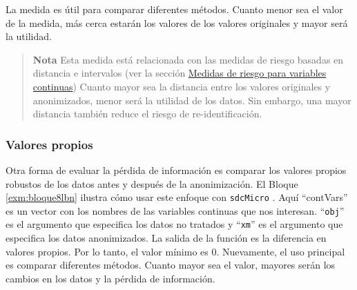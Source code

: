 \documentclass[
]{book}
\newenvironment{Shaded}{\begin{snugshade}}{\end{snugshade}}
\newcommand{\AttributeTok}[1]{\textcolor[rgb]{0.77,0.63,0.00}{#1}}
\newcommand{\CommentTok}[1]{\textcolor[rgb]{0.56,0.35,0.01}{\textit{#1}}}
\newcommand{\DocumentationTok}[1]{\textcolor[rgb]{0.56,0.35,0.01}{\textbf{\textit{#1}}}}
\newcommand{\FunctionTok}[1]{\textcolor[rgb]{0.00,0.00,0.00}{#1}}
\newcommand{\NormalTok}[1]{#1}
\newcommand{\OtherTok}[1]{\textcolor[rgb]{0.56,0.35,0.01}{#1}}
\newcommand{\SpecialCharTok}[1]{\textcolor[rgb]{0.00,0.00,0.00}{#1}}
\newcommand{\StringTok}[1]{\textcolor[rgb]{0.31,0.60,0.02}{#1}}
\theoremstyle{definition}
\theoremstyle{definition}
\theoremstyle{definition}
\theoremstyle{definition}
\theoremstyle{remark}
\begin{document}
\begin{Shaded}
\end{Shaded}

La medida es útil para comparar diferentes métodos. Cuanto menor sea el valor de la medida, más cerca estarán los valores de los valores originales y mayor será la utilidad.

\begin{quote}
\textbf{Nota}
Esta medida está relacionada con las medidas de riesgo basadas en distancia e intervalos (ver la sección \protect\hyperlink{medidas-de-riesgo-para-variables-continuas}{Medidas de riesgo para variables continuas})
Cuanto mayor sea la distancia entre los valores originales y anonimizados, menor será la utilidad de los datos. Sin embargo, una mayor distancia también reduce el riesgo de re-identificación.
\end{quote}

\hypertarget{valores-propios}{%
\subsubsection{Valores propios}\label{valores-propios}}

Otra forma de evaluar la pérdida de información es comparar los valores propios robustos de los datos antes y después de la anonimización. El Bloque \ref{exm:bloque8lbn} ilustra cómo usar este enfoque con \texttt{sdcMicro} . Aquí ``contVars'' es un vector con los nombres de las variables continuas que nos interesan. ``\texttt{obj}'' es el argumento que
especifica los datos no tratados y ``\texttt{xm}'' es el argumento que especifica los datos anonimizados. La salida de la función es la diferencia en valores propios. Por lo tanto, el valor mínimo es 0. Nuevamente, el uso principal es comparar diferentes métodos. Cuanto mayor sea el valor, mayores serán los cambios en los datos y la pérdida de información.
\end{document}

